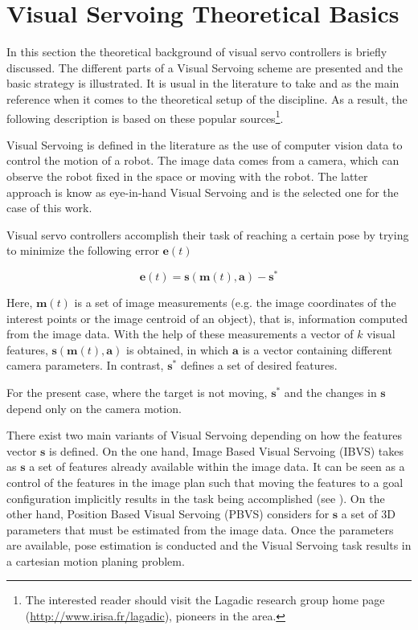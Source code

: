 \section{Visual Servoing Theoretical Basics}
\label{sec:vs-theory}

In this section the theoretical background of visual servo controllers is briefly discussed. The different parts of a Visual Servoing scheme are presented and the basic strategy is illustrated. It is usual in the literature to take \cite{chaumette_visual_2006} and \cite{chaumette_visual_2007} as the main reference when it comes to the theoretical setup of the discipline. As a result, the following description is based on these popular sources\footnote{The interested reader should visit the Lagadic research group home page (\url{http://www.irisa.fr/lagadic}), pioneers in the area.}.

Visual Servoing is defined in the literature as the use of computer vision data to control the motion of a robot. The image data comes from a camera, which can observe the robot fixed in the space or moving with the robot. The latter approach is know as eye-in-hand Visual Servoing and is the selected one for the case of this work.


Visual servo controllers accomplish their task of reaching a certain pose by trying to minimize the following error $\bm{e}(t)$

\begin{equation}
\bm{e}(t) = \bm{s}(\bm{m}(t), \bm{a}) - \bm{s}^\ast
\label{eq:vs-th-1}
\end{equation}

Here, $\bm{m}(t)$ is a set of image measurements (e.g. the image coordinates of the interest points or the image centroid of an object), that is, information computed from the image data. With the help of these measurements a vector of $k$ visual features, $\bm{s}(\bm{m}(t), \bm{a})$ is obtained, in which $\bm{a}$ is a vector containing different camera parameters. In contrast, $\bm{s}^\ast$ defines a set of desired features.

For the present case, where the target is not moving,  $\bm{s}^\ast$ and the changes in $\bm{s}$ depend only on the camera motion.

There exist two main variants of Visual Servoing depending on how the features vector $\bm{s}$ is defined. On the one hand, Image Based Visual Servoing (IBVS) takes as $\bm{s}$ a set of features already available within the image data. It can be seen as a control of the features in the image plan such that moving the features to a goal configuration implicitly results in the task being accomplished (see \cite{espiau_1992}). On the other hand, Position Based Visual Servoing (PBVS) considers for $\bm{s}$ a set of 3D parameters that must be estimated from the image data. Once the parameters are available, pose estimation is conducted and the Visual Servoing task results in a cartesian motion planing problem.

